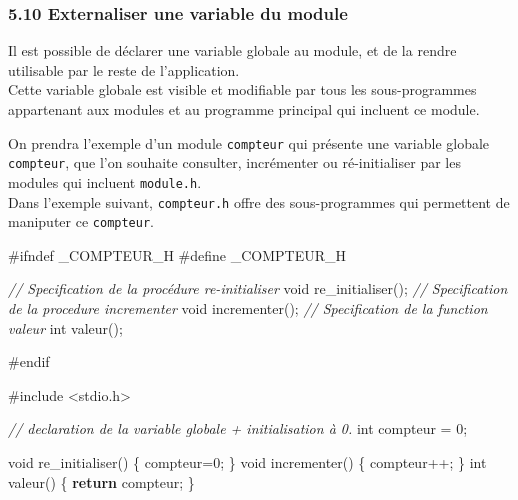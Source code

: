 \documentclass[11pt]{article}
\newenvironment{Shaded}{}{}
\newcommand{\DataTypeTok}[1]{\textcolor[rgb]{0.56,0.13,0.00}{{#1}}}
\newcommand{\DecValTok}[1]{\textcolor[rgb]{0.25,0.63,0.44}{{#1}}}
\newcommand{\CommentTok}[1]{\textcolor[rgb]{0.38,0.63,0.69}{\textit{{#1}}}}
\newcommand{\NormalTok}[1]{{#1}}
\newcommand{\ImportTok}[1]{{#1}}
\newcommand{\ControlFlowTok}[1]{\textcolor[rgb]{0.00,0.44,0.13}{\textbf{{#1}}}}
\newcommand{\PreprocessorTok}[1]{\textcolor[rgb]{0.74,0.48,0.00}{{#1}}}
\begin{document}
    \subsubsection{5.10 Externaliser une variable du
module}\label{externaliser-une-variable-du-module}

Il est possible de déclarer une variable globale au module, et de la
rendre utilisable par le reste de l'application.\\
Cette variable globale est visible et modifiable par tous les
sous-programmes appartenant aux modules et au programme principal qui
incluent ce module.

On prendra l'exemple d'un module \texttt{compteur} qui présente une
variable globale \texttt{compteur}, que l'on souhaite consulter,
incrémenter ou ré-initialiser par les modules qui incluent
\texttt{module.h}.\\
Dans l'exemple suivant, \texttt{compteur.h} offre des sous-programmes
qui permettent de maniputer ce \texttt{compteur}.

\begin{Shaded}
\begin{Highlighting}[]
\PreprocessorTok{#ifndef _COMPTEUR_H}
\PreprocessorTok{#define _COMPTEUR_H}

\CommentTok{// Specification de la procédure re-initialiser}
\DataTypeTok{void}\NormalTok{ re_initialiser();}
\CommentTok{// Specification de la procedure incrementer}
\DataTypeTok{void}\NormalTok{ incrementer();}
\CommentTok{// Specification de la function valeur}
\DataTypeTok{int}\NormalTok{ valeur();}

\PreprocessorTok{#endif }
\end{Highlighting}
\end{Shaded}

\begin{Shaded}
\begin{Highlighting}[]
\PreprocessorTok{#include }\ImportTok{<stdio.h>}

\CommentTok{// declaration de la variable globale + initialisation à 0. }
\DataTypeTok{int}\NormalTok{ compteur = }\DecValTok{0}\NormalTok{;}

\DataTypeTok{void}\NormalTok{ re_initialiser() \{}
\NormalTok{    compteur=}\DecValTok{0}\NormalTok{;}
\NormalTok{\}}
\DataTypeTok{void}\NormalTok{ incrementer() \{}
\NormalTok{    compteur++;}
\NormalTok{\}}
\DataTypeTok{int}\NormalTok{ valeur() \{}
    \ControlFlowTok{return}\NormalTok{ compteur;}
\NormalTok{\}}
\end{Highlighting}
\end{Shaded}
\end{document}
